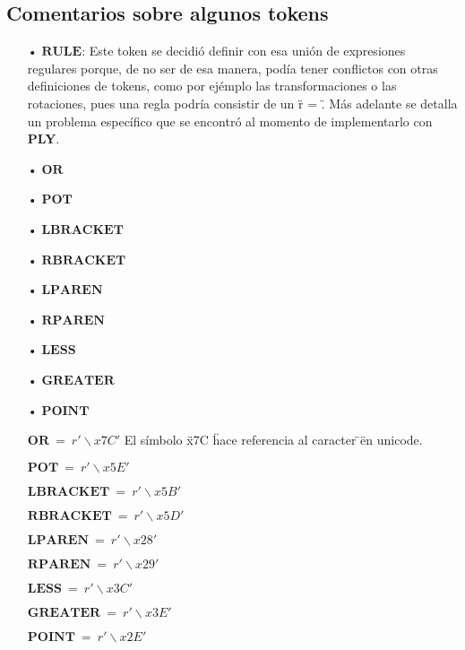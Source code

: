 \subsection{Comentarios sobre algunos tokens}
\begin{itemize}
\item[•] $\mathbf{RULE}$: Este token se decidi\'o definir con esa uni\'on de expresiones regulares porque, de no ser de esa manera, pod\'ia tener conflictos con otras definiciones de tokens, como por ej\'emplo las transformaciones o las rotaciones, pues una regla podr\'ia consistir de un \" r = \". M\'as adelante se detalla un problema espec\'ifico que se encontr\'o al momento de implementarlo con \textbf{PLY}. %
\item[•] $\mathbf{OR}$
\item[•] $\mathbf{POT}$
\item[•] $\mathbf{LBRACKET}$
\item[•] $\mathbf{RBRACKET}$
\item[•] $\mathbf{LPAREN}$
\item[•] $\mathbf{RPAREN}$
\item[•] $\mathbf{LESS}$
\item[•] $\mathbf{GREATER}$
\item[•] $\mathbf{POINT}$


 \item []$\mathbf{OR}\ =\ r'\backslash x7C'$ El s\'imbolo \" x7C \" hace referencia al caracter \" \textbar \" en unicode.
 \item []$\mathbf{POT}\ =\ r'\backslash x5E'$
 \item []$\mathbf{LBRACKET}\ =\ r'\backslash x5B'$
 \item []$\mathbf{RBRACKET}\ =\ r'\backslash x5D'$
 \item []$\mathbf{LPAREN}\ =\ r'\backslash x28'$
 \item []$\mathbf{RPAREN}\ =\ r'\backslash x29'$
 \item []$\mathbf{LESS}\ =\ r'\backslash x3C'$
 \item []$\mathbf{GREATER}\ =\ r'\backslash x3E'$
 \item []$\mathbf{POINT}\ =\ r'\backslash x2E'$

\end{itemize}
